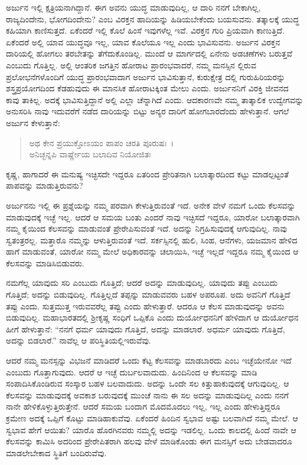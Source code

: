 ಅರ್ಜುನ ಇಲ್ಲಿ ಕ್ಷತ್ರಿಯನಾಗಿದ್ದಾನೆ. ಈಗ ಅವನು ಯುದ್ಧ ಮಾಡುವುದಿಲ್ಲ, ಆ ದಾರಿ ನನಗೆ ಬೇಕಾಗಿಲ್ಲ, ರಾಜ್ಯದಿಂದೇನು, ಭೋಗದಿಂದೇನು? ಎಂಬ ವಿರಕ್ತನ ಹಾದಿಯನ್ನು ಹಿಡಿಯಬೇಕೆಂದು ಬಯಸುವನು. ತತ್ಕಾಲಕ್ಕೆ ಯುದ್ಧ ಕಹಿಯಾಗಿ ಕಾಣಿಸುತ್ತದೆ. ಏಕೆಂದರೆ ಇಲ್ಲಿ ಕೊಲೆ ಹಿಂಸೆ ಇವುಗಳೆಲ್ಲ ಇವೆ. ವಿರಕ್ತನ ಗುರಿ ಪ್ರಿಯವಾಗಿ ಕಾಣುತ್ತಿದೆ. ಏಕೆಂದರೆ ಅಲ್ಲಿ ಯಾವ ಯುದ್ಧವೂ ಇಲ್ಲ, ಯಾವ ಕೊಲೆಯೂ ಇಲ್ಲ ಎಂದು ಭಾವಿಸುವನು. ಅರ್ಜುನ ವಿರಕ್ತನ ದಾರಿಯಲ್ಲಿ ಹೋಗಲು ತರಬೇತನ್ನು ತೆಗೆದುಕೊಂಡಿಲ್ಲ. ಮುಂದೆ ಆ ಮಾರ್ಗದಲ್ಲಿ ಏನೇನು ಅಡಚಣೆಗಳು ಬರುತ್ತವೆ ಎಂಬುದು ಗೊತ್ತಿಲ್ಲ. ಅಲ್ಲಿ ಆಂತರಿಕ ಜಗತ್ತಿನ ಹೋರಾಟ ಪ್ರಾರಂಭವಾದರೆ, ನಮ್ಮ ಮನಸ್ಸಿನ ಲ್ಲಿರುವ ಪ್ರಲೋಭನೆಗಳೊಂದಿಗೆ ಯುದ್ಧ ಪ್ರಾರಂಭವಾದಾಗ ಅರ್ಜುನ ಭಾವಿಸುತ್ತಾನೆ, ಕುರುಕ್ಷೇತ್ರ ದಲ್ಲಿ ಗುರುಹಿರಿಯರನ್ನು ಶಸ್ತ್ರಪ್ರಯೋಗದಿಂದ ಕೆಡಹುವುದು ಈ ಮಾನಸಿಕ ಹೋರಾಟಕ್ಕಿಂತ ಮೇಲು ಎಂದು. ಅರ್ಜುನನಿಗೆ ವಿರಕ್ತಿ ಜೀವನದ ಕಾವು ತಾಕಿಲ್ಲ. ಅದಕ್ಕೆ ಭಾವಿಸುತ್ತಿದ್ದಾನೆ ಅಲ್ಲಿ ಎಲ್ಲಾ ಚೆನ್ನಾಗಿದೆ ಎಂದು. ಆದಕಾರಣವೇ ನಮ್ಮ ತಾತ್ಕಾಲಿಕ ಉದ್ವೇಗವನ್ನು ಅನುಸರಿಸಿ ನಾವು ಇದುವರೆಗೆ ನಡೆದ ದಾರಿಯನ್ನು ಬಿಟ್ಟು ಅನ್ಯರ ದಾರಿಗೆ ಹೋಗಬಾರದೆಂದು ಹೇಳುತ್ತಾನೆ. ಆಗಲೆ ಅರ್ಜುನ ಕೇಳುತ್ತಾನೆ:

\begin{verse}
ಅಥ ಕೇನ ಪ್ರಯುಕ್ತೋಽಯಂ ಪಾಪಂ ಚರತಿ ಪೂರುಷಃ~।\\ಅನಿಚ್ಛನ್ನಪಿ ವಾರ್ಷ್ಣೇಯ ಬಲಾದಿವ ನಿಯೋಜಿತಃ 
\end{verse}

{\small ಕೃಷ್ಣ, ಹಾಗಾದರೆ ಈ ಮನುಷ್ಯ ಇಚ್ಛಿಸದೇ ಇದ್ದರೂ ಏತರಿಂದ ಪ್ರೇರಿತನಾಗಿ ಬಲಾತ್ಕಾರದಿಂದ ಕಟ್ಟು ಮಾಡಲ್ಪಟ್ಟಂತೆ ಪಾಪವನ್ನು ಮಾಡುತ್ತಿರುವನು?}

ಅರ್ಜುನನು ಇಲ್ಲಿ ಈ ಪ್ರಶ್ನೆಯನ್ನು ನಮ್ಮ ಪರವಾಗಿ ಕೇಳುತ್ತಿರುವಂತೆ ಇದೆ. ಅನೇಕ ವೇಳೆ ನಮಗೆ ಒಂದು ಕೆಲಸವನ್ನು ಮಾಡುವುದಕ್ಕೆ ಇಚ್ಛೆ ಇಲ್ಲ. ಆದರೆ ಆ ಸಮಯ ಬಂತು ಎಂದರೆ ನಾವು ಇಚ್ಛಿಸದೆ ಇದ್ದರೂ, ಯಾರೋ ಬಲಾತ್ಕಾರವಾಗಿ ನಮ್ಮ ಕೈಯಿಂದ ಕೆಲಸವನ್ನು ಮಾಡುವಂತೆ ಪ್ರೇರೇಪಿಸುವಂತೆ ಇದೆ. ಅದನ್ನು ನಿಗ್ರಹಿಸುವುದಕ್ಕೆ ಆಗುವುದಿಲ್ಲ. ನಾವು ಸ್ವತಂತ್ರರಲ್ಲ. ಮತ್ತಾರೊ ನಮ್ಮನ್ನು ಆಳುತ್ತಿರುವಂತೆ ಇದೆ. ಸರ್ಕಸ್ಸಿನಲ್ಲಿ ಹುಲಿ, ಸಿಂಹ, ಆನೆಗಳು, ಯಜಮಾನ ಹೇಳಿದ ಹಾಗೆ ಮಾಡುವಂತೆ, ಯಾರೋ ನಮ್ಮ ಮೇಲೆ ಅಧಿಕಾರವನ್ನು ಚಲಾಯಿಸಿ, ಇಚ್ಛೆ ಇಲ್ಲದೆ ಇದ್ದರೂ ನಮ್ಮ ಕೈಯಿಂದ ಆ ಕೆಲಸವನ್ನು ಮಾಡಿಸಿಬಿಡುವರು.

ನಮಗೆಲ್ಲ ಯಾವುದು ಸರಿ ಎಂಬುದು ಗೊತ್ತಿದೆ; ಆದರೆ ಅದನ್ನು ಮಾಡುವುದಿಲ್ಲ. ಯಾವುದು ತಪ್ಪು ಎಂಬುದು ಗೊತ್ತಿದೆ; ಅದನ್ನು ಬಿಡುವುದಿಲ್ಲ. ಗೊತ್ತಿಲ್ಲದೆ ತಪ್ಪನ್ನು ಮಾಡುವವರು ಬಹಳ ಅಪರೂಪ. ಅದು ಅವನಿಗೆ ಗೊತ್ತಿದೆ ತಪ್ಪು ಎಂದು. ಸುತ್ತಮುತ್ತ ಇರುವವರೆಲ್ಲ ತಪ್ಪು ಎಂದು ಹೇಳುತ್ತಾರೆ. ಆದರೂ ಆ ಕೆಲಸ ಮಾಡುವುದನ್ನು ಅವನು ಬಿಡುವುದಿಲ್ಲ. ಮಹಾಭಾರತದಲ್ಲಿ ಶ‍್ರೀಕೃಷ್ಣ ಸಂಧಿಗೆ ಒಪ್ಪಿಕೊ ಎಂದು ದುರ್ಯೋಧನನಿಗೆ ಹೇಳಿದಾಗ ಆ ದುರ್ಯೋಧನ ಹೀಗೆ ಹೇಳುತ್ತಾನೆ: “ನನಗೆ ಧರ್ಮ ಯಾವುದು ಗೊತ್ತಿದೆ, ಅದನ್ನು ಮಾಡಲಾರೆ. ಅಧರ್ಮ ಯಾವುದು ಗೊತ್ತಿದೆ, ಅದನ್ನು ಬಿಡಲಾರೆ.” ನಾವೆಲ್ಲ ಆ ಪರಿಸ್ಥಿತಿಯಲ್ಲಿಇರುವೆವು.

ಆದರೆ ನಮ್ಮ ಮನಸ್ಸನ್ನು ವಿಭಜನೆ ಮಾಡಿದರೆ ಒಂದು ಕೆಟ್ಟ ಕೆಲಸವನ್ನು ಮಾಡಬಾರದು ಎಂಬ ಇಚ್ಛೆಯೇನೋ ಇದೆ ಎಂಬುದು ಗೊತ್ತಾಗುವುದು. ಆದರೆ ಆ ಇಚ್ಛೆ ದುರ್ಬಲವಾದುದು. ಹಿಂದಿನಿಂದ ಆ ಕೆಲಸವನ್ನು ಮಾಡಿ ಸಂಪಾದಿಸಿಕೊಂಡಿರುವ ಸಂಸ್ಕಾರ ಬಹಳ ಬಲವಾದುದು. ಅದನ್ನು ಒಂದೇ ಸಲ ಕಿತ್ತುಹಾಕುವುದಕ್ಕೆ ಆಗುವುದಿಲ್ಲ. ಆ ಕೆಲಸವನ್ನು ಮಾಡುವುದಕ್ಕೆ ಅವಕಾಶ ಬರುವುದಕ್ಕೆ ಮುಂಚೆ ನಾನು ಈ ಸಲ ಅದನ್ನು ಮಾಡುವುದಿಲ್ಲ ಎಂದು ನನಗೆ ನಾನೇ ಹೇಳಿಕೊಳ್ಳುತ್ತಿರುತ್ತೇನೆ. ಆದರೆ ಸಮಯ ಬಂದಾಗ ಮೊದಮೊದಲು ಇಲ್ಲ, ಇಲ್ಲ ಎಂದು ಹೇಳುತ್ತಿದ್ದರೂ ಕ್ರಮೇಣ ಅದಕ್ಕೆ ಒಪ್ಪಿಗೆ ಕೊಟ್ಟು ಮಾಡಿಹಾಕುವೆವು. ಏಕೆಂದರೆ ಹಿಂದಿನ ಸ್ವಭಾವ ಅಷ್ಟು ಬಲವಾಗಿದೆ ನಮ್ಮ ಮೇಲೆ. ಆ ಸ್ವಭಾವ ಹೇಗೆ ಆಯಿತು? ಯಾರೊ ಹೊರಗಿನವರು ನಮ್ಮಲ್ಲಿ ಅದನ್ನು ಇಡಲಿಲ್ಲ. ಒಂದು ಕಾಲದಲ್ಲಿ ಹಿಂದೆ ನಾವೇ ಆ ಕೆಲಸವನ್ನು ಕಾಮಿಸಿ ಅದರಿಂದ ಪ್ರೇರೇಪಿತರಾಗಿ ಹಲವು ವೇಳೆ ಮಾಡಿಕೊಂಡು ಈಗ ಮನಸ್ಸಿಗೆ ಅದು ಬೇಡವಾದರೂ ಮಾಡಲೇಬೇಕಾದ ಸ್ಥಿತಿಗೆ ಬಂದಿರುವೆವು.

